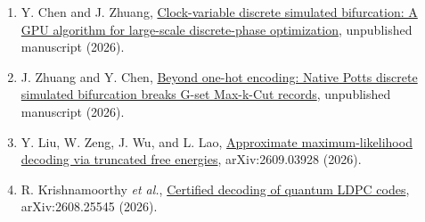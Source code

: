 \documentclass[
  10pt,
]{article}
\begin{document}
\begin{enumerate}
{  for higher-order cost functions}, Appl. Phys. Express \textbf{16},
  014501 (2023).
\item
  \hypertarget{ref:29}{} Y. Chen and J. Zhuang,
  \href{https://github.com/yaochengchen/clock-dsb}{Clock-variable
  discrete simulated bifurcation: A GPU algorithm for large-scale
  discrete-phase optimization}, unpublished manuscript (2026).
\item
  \hypertarget{ref:30}{} J. Zhuang and Y. Chen,
  \href{https://github.com/yaochengchen/PdSB}{Beyond one-hot encoding:
  Native Potts discrete simulated bifurcation breaks G-set Max-k-Cut
  records}, unpublished manuscript (2026).
\item
  \hypertarget{ref:31}{} Y. Liu, W. Zeng, J. Wu, and L. Lao,
  \href{https://arxiv.org/abs/2609.03928}{Approximate maximum-likelihood
  decoding via truncated free energies}, arXiv:2609.03928 (2026).
\item
  \hypertarget{ref:32}{} R. Krishnamoorthy \emph{et al.},
  \href{https://arxiv.org/abs/2608.25545}{Certified decoding of quantum
  LDPC codes}, arXiv:2608.25545 (2026).
\end{enumerate}
\end{document}

